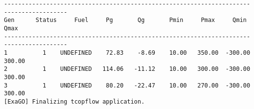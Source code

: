 \begin{lstlisting}
----------------------------------------------------------------------------------------
Gen      Status     Fuel     Pg       Qg       Pmin     Pmax     Qmin     Qmax  
----------------------------------------------------------------------------------------
1          1    UNDEFINED    72.83    -8.69    10.00   350.00  -300.00   300.00
2          1    UNDEFINED   114.06   -11.12    10.00   300.00  -300.00   300.00
3          1    UNDEFINED    80.20   -22.47    10.00   270.00  -300.00   300.00
[ExaGO] Finalizing tcopflow application.
\end{lstlisting}

